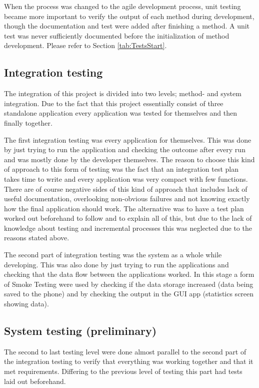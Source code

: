 When the process was changed to the agile development process, unit testing became more important to verify the output of each method during development, though the documentation and test were added after finishing a method. A unit test was never sufficiently documented before the initialization of method development. Please refer to Section \ref{tab:TestsStart}.
\subsection{Integration testing}
The integration of this project is divided into two levels; method- and system integration. Due to the fact that this project essentially consist of three standalone application every application was tested for themselves and then finally together.

The first integration testing was every application for themselves. This was done by just trying to run the application and checking the outcome after every run and was mostly done by the developer themselves. The reason to choose this kind of approach to this form of testing was the fact that an integration test plan takes time to write and every application was very compact with few functions. There are of course negative sides of this kind of approach that includes lack of useful documentation, overlooking non-obvious failures and not knowing exactly how the final application should work. The alternative was to have a test plan worked out beforehand to follow and to explain all of this, but due to the lack of knowledge about testing and incremental processes this was neglected due to the reasons stated above.

The second part of integration testing was the system as a whole while developing. This was also done by just trying to run the applications and checking that the data flow between the applications worked. In this stage a form of Smoke Testing were used by checking if the data storage increased (data being saved to the phone) and by checking the output in the GUI app (statistics screen showing data).
\subsection{System testing (preliminary)}
The second to last testing level were done almost parallel to the second part of the integration testing to verify that everything was working together and that it met requirements. Differing to the previous level of testing this part had tests laid out beforehand.


